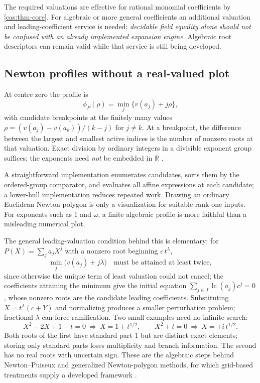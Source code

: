 \documentclass[11pt,letterpaper]{article}
\numberwithin{equation}{section}
\theoremstyle{definition}
\theoremstyle{remark}
\newcommand{\R}{\mathbb R}
\newcommand{\lc}{\operatorname{lc}}
\begin{document}
The required valuations are effective for rational monomial coefficients by
\cref{cas:thm-core}. For algebraic or more general coefficients an additional
valuation and leading-coefficient service is needed; \emph{decidable field
equality alone should not be confused with an already implemented expansion
engine}. Algebraic root descriptors can remain valid while that service is still
being developed.

\subsection{Newton profiles without a real-valued plot}
\label{cas:sub-newton}
At centre zero the profile is
\[
 \phi_P(\rho)=\min_j\{v(a_j)+j\rho\},
\]
with candidate breakpoints at the finitely many values
$\rho=(v(a_j)-v(a_k))/(k-j)$ for $j\ne k$. At a breakpoint, the difference
between the largest and smallest active indices is the number of nonzero roots
at that valuation. Exact division by ordinary integers in a divisible exponent
group suffices; the exponents need \emph{not} be embedded in $\R$
\cite{cas:SourcePolynomial}.

A straightforward implementation enumerates candidates, sorts them by the
ordered-group comparator, and evaluates all affine expressions at each
candidate; a lower-hull implementation reduces repeated work. Drawing an
ordinary Euclidean Newton polygon is only a visualization for suitable rank-one
inputs. For exponents such as $1$ and $\omega$, a finite algebraic profile is
more faithful than a misleading numerical plot.

The general leading-valuation condition behind this is elementary: for
$P(X)=\sum_{j}a_jX^j$ with a nonzero root beginning $c\,t^\lambda$,
\begin{equation}\label{cas:eq-newtonmin}
 \min_j\bigl(v(a_j)+j\lambda\bigr)\quad\text{must be attained at least twice},
\end{equation}
since otherwise the unique term of least valuation could not cancel; the
coefficients attaining the minimum give the initial equation
$\sum_{j\in J}\lc(a_j)c^j=0$, whose nonzero roots are the candidate leading
coefficients. Substituting $X=t^\lambda(c+Y)$ and normalizing produces a smaller
perturbation problem; fractional $\lambda$ can force ramification. Two small
examples need no infinite search:
\[
 X^2-2X+1-t=0\ \Longrightarrow\ X=1\pm t^{1/2},
 \qquad X^2+t=0\ \Longrightarrow\ X=\pm i\,t^{1/2}.
\]
Both roots of the first have standard part $1$ but are distinct exact elements;
storing only standard parts loses multiplicity and branch information. The
second has no real roots with uncertain sign. These are the algebraic steps
behind Newton--Puiseux and generalized Newton-polygon methods, for which
grid-based treatments supply a developed framework \cite{cas:vdH}.
\end{document}
